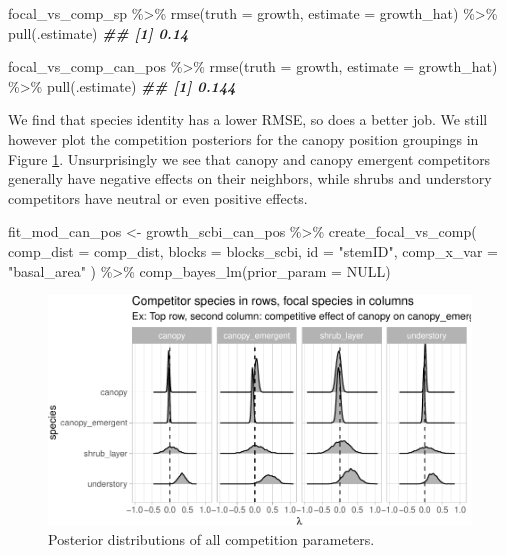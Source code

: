 \documentclass[12pt]{article}
\newenvironment{Shaded}{\begin{snugshade}}{\end{snugshade}}
\newcommand{\AttributeTok}[1]{\textcolor[rgb]{0.77,0.63,0.00}{#1}}
\newcommand{\ConstantTok}[1]{\textcolor[rgb]{0.00,0.00,0.00}{#1}}
\newcommand{\DocumentationTok}[1]{\textcolor[rgb]{0.56,0.35,0.01}{\textbf{\textit{#1}}}}
\newcommand{\FunctionTok}[1]{\textcolor[rgb]{0.00,0.00,0.00}{#1}}
\newcommand{\NormalTok}[1]{#1}
\newcommand{\OtherTok}[1]{\textcolor[rgb]{0.56,0.35,0.01}{#1}}
\newcommand{\SpecialCharTok}[1]{\textcolor[rgb]{0.00,0.00,0.00}{#1}}
\newcommand{\StringTok}[1]{\textcolor[rgb]{0.31,0.60,0.02}{#1}}
\begin{document}
\begin{Shaded}
\begin{Highlighting}[]
\NormalTok{focal\_vs\_comp\_sp }\SpecialCharTok{\%\textgreater{}\%}
    \FunctionTok{rmse}\NormalTok{(}\AttributeTok{truth =}\NormalTok{ growth, }\AttributeTok{estimate =}\NormalTok{ growth\_hat) }\SpecialCharTok{\%\textgreater{}\%}
    \FunctionTok{pull}\NormalTok{(.estimate)}
\DocumentationTok{\#\# [1] 0.14}

\NormalTok{focal\_vs\_comp\_can\_pos }\SpecialCharTok{\%\textgreater{}\%}
    \FunctionTok{rmse}\NormalTok{(}\AttributeTok{truth =}\NormalTok{ growth, }\AttributeTok{estimate =}\NormalTok{ growth\_hat) }\SpecialCharTok{\%\textgreater{}\%}
    \FunctionTok{pull}\NormalTok{(.estimate)}
\DocumentationTok{\#\# [1] 0.144}
\end{Highlighting}
\end{Shaded}

We find that species identity has a lower RMSE, so does a better job. We
still however plot the competition posteriors for the canopy position
groupings in Figure \ref{fig:can-pos-comp-plot}. Unsurprisingly we see
that canopy and canopy emergent competitors generally have negative
effects on their neighbors, while shrubs and understory competitors have
neutral or even positive effects.

\begin{Shaded}
\begin{Highlighting}[]
\NormalTok{fit\_mod\_can\_pos }\OtherTok{\textless{}{-}}\NormalTok{ growth\_scbi\_can\_pos }\SpecialCharTok{\%\textgreater{}\%}
  \FunctionTok{create\_focal\_vs\_comp}\NormalTok{(}
    \AttributeTok{comp\_dist =}\NormalTok{ comp\_dist,}
    \AttributeTok{blocks =}\NormalTok{ blocks\_scbi,}
    \AttributeTok{id =} \StringTok{"stemID"}\NormalTok{,}
    \AttributeTok{comp\_x\_var =} \StringTok{"basal\_area"}
\NormalTok{  ) }\SpecialCharTok{\%\textgreater{}\%}
  \FunctionTok{comp\_bayes\_lm}\NormalTok{(}\AttributeTok{prior\_param =} \ConstantTok{NULL}\NormalTok{)}
\end{Highlighting}
\end{Shaded}

\begin{figure}

{\centering \includegraphics[width=1\linewidth]{Figures/can-pos-comp-plot-1} 

}

\caption{Posterior distributions of all competition parameters.}\label{fig:can-pos-comp-plot}
\end{figure}
\end{document}
